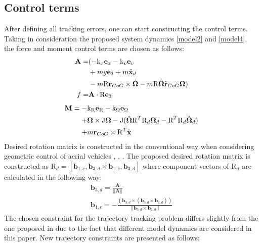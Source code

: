 \subsection{Control terms}
After defining all tracking errors, one can start constructing the control terms. Taking in consideration the proposed system dynamics \ref{model2} and \ref{model4}, the force and moment control terms are chosen as follows:
\begin{align}
	\begin{split}
		\textbf{A} =& (- \text{k}_x \textbf{e}_x - \text{k}_v \textbf{e}_v \\
		& + mg\textbf{e}_3 + m\ddot{\textbf{x}}_d \\
		& - m\text{R}\textbf{r}_{CoG}  \times \dot{\boldsymbol{\Omega}} - m\text{R}\hat{\boldsymbol{\Omega}}\hat{\textbf{r}}_{CoG}\boldsymbol{\Omega} ) \\
		f =& \textbf{A} \cdot \text{R}\textbf{e}_3 \label{force_control}
	\end{split}
\end{align}
\begin{align}
	\begin{split}
		\textbf{M} = -& \text{k}_\text{R} \textbf{e}_\text{R} - \text{k}_\Omega \textbf{e}_\Omega \\
			+& \boldsymbol{\Omega} \times \text{J}\boldsymbol{\Omega} - \text{J}(\hat{\boldsymbol{\Omega}}\text{R}^T\text{R}_d\boldsymbol{\Omega}_d - \text{R}^T\text{R}_d\dot{\boldsymbol{\Omega}}_d) \\
			+& m\textbf{r}_{CoG} \times \text{R}^T \ddot{\textbf{x}}  \label{moment_control}
	\end{split}
\end{align}
\indent Desired rotation matrix is constructed in the conventional way when considering geometric control of aerial vehicles \cite{LeeClanak4}, \cite{LeeClanak3}, \cite{LeeClanak2}. The proposed desired rotation matrix is constructed as $\text{R}_d = [\textbf{b}_{1,c}, \textbf{b}_{3,d} \times \textbf{b}_{1,c}, \textbf{b}_{3,d}]$ where component vectors of $\text{R}_d$ are calculated in the following way:
\begin{gather}
	\textbf{b}_{3,d} = \frac{\textbf{A}}{|| \textbf{A} ||} \\
	\textbf{b}_{1,c} = -\frac{(\textbf{b}_{3,d} \times (\textbf{b}_{3,d} \times \textbf{b}_{1,d}))}{||\textbf{b}_{3,d} \times \textbf{b}_{1,d}||}
\end{gather}
The chosen constraint for the trajectory tracking problem differs slightly from the one proposed in \cite{LeeClanak4} due to the fact that different model dynamics are considered in this paper. New trajectory constraints are presented as follows:
